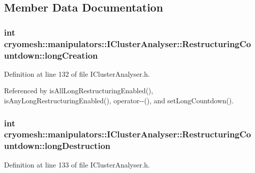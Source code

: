 \subsection{\-Member \-Data \-Documentation}
\hypertarget{structcryomesh_1_1manipulators_1_1IClusterAnalyser_1_1RestructuringCountdown_ac248eef511236bbb0c9d5e6b454a97a3}{
\subsubsection[{long\-Creation}]{\setlength{\rightskip}{0pt plus 5cm}int {\bf cryomesh\-::manipulators\-::\-I\-Cluster\-Analyser\-::\-Restructuring\-Countdown\-::long\-Creation}}}\label{structcryomesh_1_1manipulators_1_1IClusterAnalyser_1_1RestructuringCountdown_ac248eef511236bbb0c9d5e6b454a97a3}


\-Definition at line 132 of file \-I\-Cluster\-Analyser.\-h.



\-Referenced by is\-All\-Long\-Restructuring\-Enabled(), is\-Any\-Long\-Restructuring\-Enabled(), operator-\/-\/(), and set\-Long\-Countdown().

\hypertarget{structcryomesh_1_1manipulators_1_1IClusterAnalyser_1_1RestructuringCountdown_a147c9ec6f5896ca4e8151e01eb764d0e}{
\subsubsection[{long\-Destruction}]{\setlength{\rightskip}{0pt plus 5cm}int {\bf cryomesh\-::manipulators\-::\-I\-Cluster\-Analyser\-::\-Restructuring\-Countdown\-::long\-Destruction}}}\label{structcryomesh_1_1manipulators_1_1IClusterAnalyser_1_1RestructuringCountdown_a147c9ec6f5896ca4e8151e01eb764d0e}


\-Definition at line 133 of file \-I\-Cluster\-Analyser.\-h.



